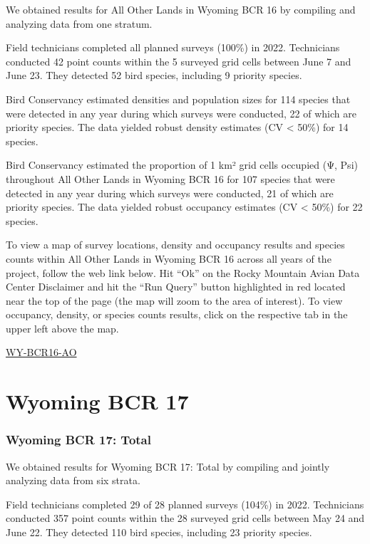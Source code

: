 \documentclass[
  letterpaper,
  DIV=11,
  numbers=noendperiod,
  oneside]{scrreprt}
\begin{document}
We obtained results for All Other Lands in Wyoming BCR 16 by compiling
and analyzing data from one stratum.

Field technicians completed all planned surveys (100\%) in 2022.
Technicians conducted 42 point counts within the 5 surveyed grid cells
between June 7 and June 23. They detected 52 bird species, including 9
priority species.

Bird Conservancy estimated densities and population sizes for 114
species that were detected in any year during which surveys were
conducted, 22 of which are priority species. The data yielded robust
density estimates (CV \textless{} 50\%) for 14 species.

Bird Conservancy estimated the proportion of 1 km² grid cells occupied
(Ψ, Psi) throughout All Other Lands in Wyoming BCR 16 for 107 species
that were detected in any year during which surveys were conducted, 21
of which are priority species. The data yielded robust occupancy
estimates (CV \textless{} 50\%) for 22 species.

To view a map of survey locations, density and occupancy results and
species counts within All Other Lands in Wyoming BCR 16 across all years
of the project, follow the web link below. Hit ``Ok'' on the Rocky
Mountain Avian Data Center Disclaimer and hit the ``Run Query'' button
highlighted in red located near the top of the page (the map will zoom
to the area of interest). To view occupancy, density, or species counts
results, click on the respective tab in the upper left above the map.

\href{http://www.rmbo.org/new_site/adc/QueryWindow.aspx\#N4IgzgLgTghhCuBbEAuABCA6gTQLQCEBhAJQEYA2XAQQHl0qAbBtGiACwFMo0AZGAOwAmYEAF8gA}{WY-BCR16-AO}

\hypertarget{wyoming-bcr-17}{%
\section{Wyoming BCR 17}\label{wyoming-bcr-17}}

\hypertarget{wyoming-bcr-17-total}{%
\subsubsection{Wyoming BCR 17: Total}\label{wyoming-bcr-17-total}}

We obtained results for Wyoming BCR 17: Total by compiling and jointly
analyzing data from six strata.

Field technicians completed 29 of 28 planned surveys (104\%) in 2022.
Technicians conducted 357 point counts within the 28 surveyed grid cells
between May 24 and June 22. They detected 110 bird species, including 23
priority species.
\end{document}
